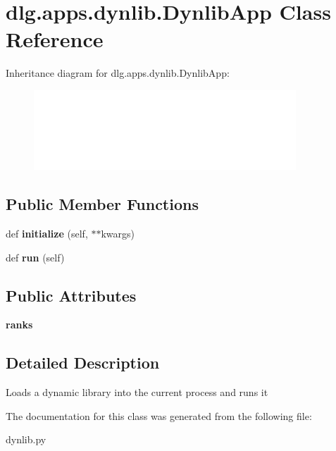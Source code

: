 \hypertarget{classdlg_1_1apps_1_1dynlib_1_1_dynlib_app}{}\section{dlg.\+apps.\+dynlib.\+Dynlib\+App Class Reference}
\label{classdlg_1_1apps_1_1dynlib_1_1_dynlib_app}
Inheritance diagram for dlg.\+apps.\+dynlib.\+Dynlib\+App\+:\begin{figure}[H]
\begin{center}
\leavevmode
\includegraphics[height=3.000000cm]{classdlg_1_1apps_1_1dynlib_1_1_dynlib_app}
\end{center}
\end{figure}
\subsection*{Public Member Functions}
\begin{DoxyCompactItemize}
\item 
\mbox{\label{classdlg_1_1apps_1_1dynlib_1_1_dynlib_app_aecea0a21848f6a08a69c5288da5f46cc}} 
def {\bfseries initialize} (self, $\ast$$\ast$kwargs)
\item 
\mbox{\label{classdlg_1_1apps_1_1dynlib_1_1_dynlib_app_aa493735d6f17ce62d203db4dea18df9a}} 
def {\bfseries run} (self)
\end{DoxyCompactItemize}
\subsection*{Public Attributes}
\begin{DoxyCompactItemize}
\item 
\mbox{\label{classdlg_1_1apps_1_1dynlib_1_1_dynlib_app_a770659909595ffd848247ce271418b1d}} 
{\bfseries ranks}
\end{DoxyCompactItemize}


\subsection{Detailed Description}
\begin{DoxyVerb}Loads a dynamic library into the current process and runs it\end{DoxyVerb}
 

The documentation for this class was generated from the following file\+:\begin{DoxyCompactItemize}
\item 
dynlib.\+py\end{DoxyCompactItemize}
